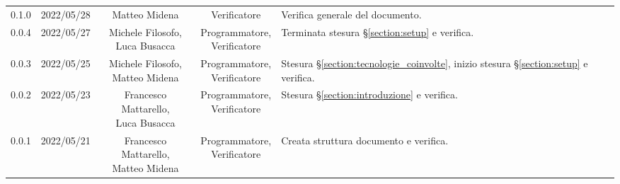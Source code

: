 \begin{center}
\begin{longtable}[c]{c | c | c | c | p{5cm}}
		0.1.0 & 2022/05/28 & Matteo Midena & Verificatore & Verifica generale del documento.\\
		0.0.4 & 2022/05/27 & \Shortunderstack{Michele Filosofo,\\ Luca Busacca} & \Shortunderstack{Programmatore, \\Verificatore}& Terminata stesura §\ref{section:setup} e verifica.\\
		0.0.3 & 2022/05/25 & \Shortunderstack{Michele Filosofo, \\Matteo Midena} & \Shortunderstack{Programmatore, \\Verificatore} & Stesura §\ref{section:tecnologie_coinvolte}, inizio stesura §\ref{section:setup} e verifica.\\
		0.0.2 & 2022/05/23 & \Shortunderstack{Francesco Mattarello, \\Luca Busacca} & \Shortunderstack{Programmatore,\\Verificatore} & Stesura §\ref{section:introduzione} e verifica.\\
		0.0.1 & 2022/05/21 & \Shortunderstack{Francesco Mattarello, \\Matteo Midena} & \Shortunderstack{Programmatore, \\ Verificatore} & Creata struttura documento e verifica.\\

	\end{longtable}
\end{center}